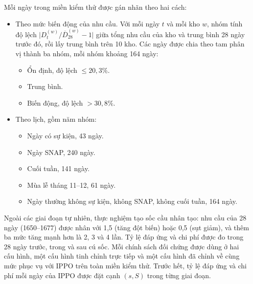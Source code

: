 Mỗi ngày trong miền kiểm thử được gán nhãn theo hai cách:
\begin{itemize}
    \item Theo mức biến động của nhu cầu. Với mỗi ngày $t$ và mỗi kho $w$, nhóm tính độ lệch $\bigl|D_t^{(w)} / \overline{D}_{28}^{(w)} - 1\bigr|$ giữa tổng nhu cầu của kho và trung bình 28 ngày trước đó, rồi lấy trung bình trên 10 kho. Các ngày được chia theo tam phân vị thành ba nhóm, mỗi nhóm khoảng 164 ngày:
    \begin{itemize}
        \item Ổn định, độ lệch $\le 20{,}3\%$.
        \item Trung bình.
        \item Biến động, độ lệch $> 30{,}8\%$.
    \end{itemize}
    \item Theo lịch, gồm năm nhóm:
    \begin{itemize}
        \item Ngày có sự kiện, 43 ngày.
        \item Ngày SNAP, 240 ngày.
        \item Cuối tuần, 141 ngày.
        \item Mùa lễ tháng 11--12, 61 ngày.
        \item Ngày thường không sự kiện, không SNAP, không cuối tuần, 164 ngày.
    \end{itemize}
\end{itemize}

Ngoài các giai đoạn tự nhiên, thực nghiệm tạo sốc cầu nhân tạo: nhu cầu của 28 ngày (1650--1677) được nhân với 1,5 (tăng đột biến) hoặc 0,5 (sụt giảm), và thêm ba mức tăng mạnh hơn là 2, 3 và 4 lần. Tỷ lệ đáp ứng và chi phí được đo trong 28 ngày trước, trong và sau cú sốc. Mỗi chính sách đối chứng được dùng ở hai cấu hình, một cấu hình tinh chỉnh trực tiếp và một cấu hình đã chỉnh về cùng mức phục vụ với IPPO trên toàn miền kiểm thử. Trước hết, tỷ lệ đáp ứng và chi phí mỗi ngày của IPPO được đặt cạnh $(s,S)$ trong từng giai đoạn.

